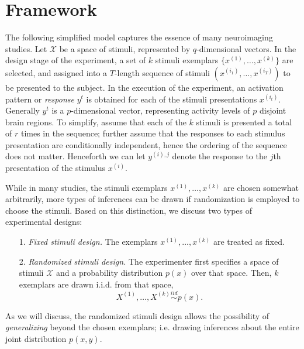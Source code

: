 \documentclass[12pt]{article}
\begin{document}
\section{Framework}

The following simplified model captures the essence of many
neuroimaging studies.  Let $\mathcal{X}$ be a space of stimuli,
represented by $q$-dimensional vectors.  In the design stage of the
experiment, a set of $k$ stimuli exemplars $\{x^{(1)},\hdots, x^{(k)}\}$ are
selected, and assigned into a $T$-length sequence of stimuli $(
x^{(i_1)},\hdots, x^{(i_T)} )$ to be presented to the subject.  In the
execution of the experiment, an activation pattern or \emph{response}
$y^{t}$ is obtained for each of the stimuli presentations $x^{(i_t)}$.
Generally $y^t$ is a $p$-dimensional vector, representing activity
levels of $p$ disjoint brain regions.  To simplify, assume that each
of the $k$ stimuli is presented a total of $r$ times in the sequence;
further assume that the responses to each stimulus presentation are
conditionally independent, hence the ordering of the sequence does not
matter.  Henceforth we can let $y^{(i),j}$ denote the response to the
$j$th presentation of the stimulus $x^{(i)}$.

While in many studies, the stimuli exemplars $x^{(1)},\hdots,x^{(k)}$
are chosen somewhat arbitrarily, more types of inferences can be drawn
if randomization is employed to choose the stimuli.
Based on this distinction, we discuss two types of experimental designs:
\begin{itemize}
\item[1.] \emph{Fixed stimuli design.}
The exemplars $x^{(1)},\hdots, x^{(k)}$ are treated as fixed.
\item[2.] \emph{Randomized stimuli design.}
The experimenter first specifies a space of stimuli $\mathcal{X}$
and a probability distribution $p(x)$ over that space.
Then, $k$ exemplars are drawn i.i.d. from that space,
\[
X^{(1)},\hdots, X^{(k)} \stackrel{iid}{\sim} p(x).
\]
\end{itemize}

As we will discuss, the randomized stimuli design allows the
possibility of
\emph{generalizing} beyond the chosen exemplars;
i.e. drawing inferences about the entire joint distribution $p(x, y)$.
\end{document}

